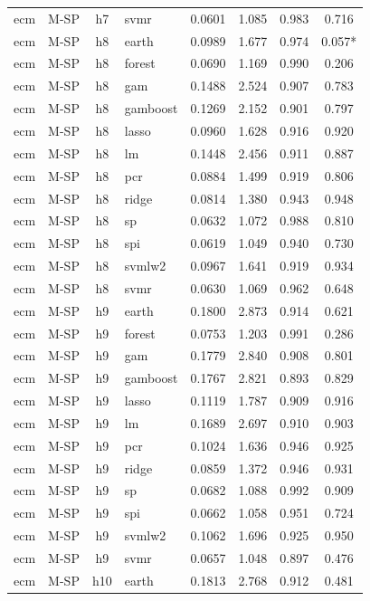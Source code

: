 \begin{ThreePartTable}
\begin{longtable}[t]{llclcccc}
ecm & M-SP & h7 & svmr & 0.0601 & 1.085 & 0.983 & 0.716\\
\addlinespace
ecm & M-SP & h8 & earth & 0.0989 & 1.677 & 0.974 & 0.057*\\
ecm & M-SP & h8 & forest & 0.0690 & 1.169 & 0.990 & 0.206\\
ecm & M-SP & h8 & gam & 0.1488 & 2.524 & 0.907 & 0.783\\
ecm & M-SP & h8 & gamboost & 0.1269 & 2.152 & 0.901 & 0.797\\
ecm & M-SP & h8 & lasso & 0.0960 & 1.628 & 0.916 & 0.920\\
ecm & M-SP & h8 & lm & 0.1448 & 2.456 & 0.911 & 0.887\\
ecm & M-SP & h8 & pcr & 0.0884 & 1.499 & 0.919 & 0.806\\
ecm & M-SP & h8 & ridge & 0.0814 & 1.380 & 0.943 & 0.948\\
ecm & M-SP & h8 & sp & 0.0632 & 1.072 & 0.988 & 0.810\\
ecm & M-SP & h8 & spi & 0.0619 & 1.049 & 0.940 & 0.730\\
ecm & M-SP & h8 & svmlw2 & 0.0967 & 1.641 & 0.919 & 0.934\\
ecm & M-SP & h8 & svmr & 0.0630 & 1.069 & 0.962 & 0.648\\
\addlinespace
ecm & M-SP & h9 & earth & 0.1800 & 2.873 & 0.914 & 0.621\\
ecm & M-SP & h9 & forest & 0.0753 & 1.203 & 0.991 & 0.286\\
ecm & M-SP & h9 & gam & 0.1779 & 2.840 & 0.908 & 0.801\\
ecm & M-SP & h9 & gamboost & 0.1767 & 2.821 & 0.893 & 0.829\\
ecm & M-SP & h9 & lasso & 0.1119 & 1.787 & 0.909 & 0.916\\
ecm & M-SP & h9 & lm & 0.1689 & 2.697 & 0.910 & 0.903\\
ecm & M-SP & h9 & pcr & 0.1024 & 1.636 & 0.946 & 0.925\\
ecm & M-SP & h9 & ridge & 0.0859 & 1.372 & 0.946 & 0.931\\
ecm & M-SP & h9 & sp & 0.0682 & 1.088 & 0.992 & 0.909\\
ecm & M-SP & h9 & spi & 0.0662 & 1.058 & 0.951 & 0.724\\
ecm & M-SP & h9 & svmlw2 & 0.1062 & 1.696 & 0.925 & 0.950\\
ecm & M-SP & h9 & svmr & 0.0657 & 1.048 & 0.897 & 0.476\\
\addlinespace
ecm & M-SP & h10 & earth & 0.1813 & 2.768 & 0.912 & 0.481\\

\end{longtable}
\end{ThreePartTable}
